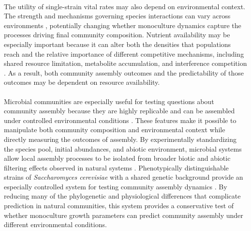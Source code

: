 \paragraph*{}
The utility of single-strain vital rates may also depend on environmental context. The strength and mechanisms governing species interactions can vary across environments \parencite{van2022small}, potentially changing whether monoculture dynamics capture the processes driving final community composition. Nutrient availability may be especially important because it can alter both the densities that populations reach and the relative importance of different competitive mechanisms, including shared resource limitation, metabolite accumulation, and interference competition \parencite{salvado2011quantifying, albergaria2016dominance}. As a result, both community assembly outcomes and the predictability of those outcomes may be dependent on resource availability.



\paragraph*{} Microbial communities are especially useful for testing questions about community assembly because they are highly replicable and can be assembled under controlled environmental conditions \parencite{nemergut2013patterns}. These features make it possible to manipulate both community composition and environmental context while directly measuring the outcomes of assembly. By experimentally standardizing the species pool, initial abundances, and abiotic environment, microbial systems allow local assembly processes to be isolated from broader biotic and abiotic filtering effects observed in natural systems \parencite{weiher2011advances}. Phenotypically distinguishable strains of \textit{Saccharomyces cerevisiae} with a shared genetic background provide an especially controlled system for testing community assembly dynamics \parencite{mitchell2015versatile}. By reducing many of the phylogenetic and physiological differences that complicate prediction in natural communities, this system provides a conservative test of whether monoculture growth parameters can predict community assembly under different environmental conditions. 

